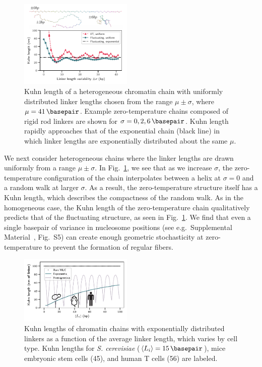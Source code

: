 \documentclass[%
 reprint,
superscriptaddress,
showpacs,preprintnumbers,
 amsmath,amssymb,
 aps,
 prl,
floatfix,
]{revtex4-1}
\newcommand{\meanli}{\left\langle{}L_i\right\rangle}
\begin{document}
\begin{figure}[t]
    \centering
    \includegraphics[width=0.48\textwidth]{fig3.pdf}%
    \caption{Kuhn length of a heterogeneous chromatin chain with uniformly
    distributed linker lengths chosen from the range $\mu \pm \sigma$, where
    $\mu = \SI{41}{\basepair}$. Example zero-temperature chains composed of rigid
    rod linkers are shown for $\sigma = 0, 2, \SI{6}{\basepair}$. Kuhn length
    rapidly approaches that of the exponential chain (black line) in which linker lengths are exponentially distributed about the same $\mu$. }\label{fig:hetero-geom}
\end{figure}

We next consider heterogeneous chains where the linker lengths are drawn uniformly from a
    range $\mu \pm \sigma$.
In Fig.~\ref{fig:hetero-geom}, we see that as we increase $\sigma$, the
    zero-temperature configuration of the chain interpolates between a helix at
    $\sigma = 0$ and a random walk at larger $\sigma$.
As a result, the zero-temperature structure itself has a Kuhn length, which describes the compactness of the random walk.
As in the homogeneous case, the Kuhn length of the zero-temperature chain
    qualitatively predicts that of the fluctuating structure, as seen in
    Fig.~\ref{fig:hetero-geom}.
We find that even a single basepair of variance in nucleosome positions (see e.g.\ Supplemental Material~\cite{supplemental}, Fig.~S5) can create enough geometric stochasticity at zero-temperature to prevent the formation of regular fibers.

\begin{figure}[t]
    \centering
    \includegraphics[width=0.48\textwidth]{fig4.pdf}%
    \caption{Kuhn lengths of chromatin chains with exponentially
    distributed linkers as a function of the average linker length, which
    varies by cell type. Kuhn lengths for \textit{S. cerevisiae}
    ($\meanli=\SI{15}{\basepair}$), mice embryonic stem cells
    (\SI{45}{\basepair}), and human T cells
    (\SI{56}{\basepair}) are labeled.}\label{fig:exp-chain}
\end{figure}
\end{document}

